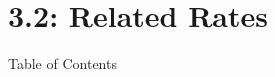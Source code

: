 
\section*{3.2: Related Rates}

\begin{frame}{Table of Contents}

\mapofcontentsC{\cb}
\end{frame}



